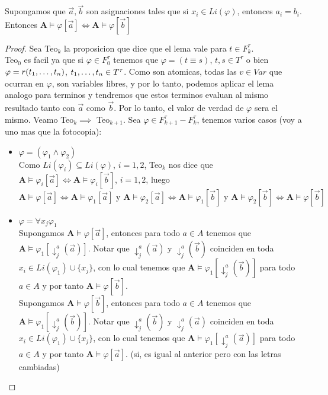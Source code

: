 \begin{lemma}
  Supongamos que $\vec{a}, \vec{b}$ son asignaciones tales que si $x_i \in Li(\varphi)$, entonces $a_i = b_i$. Entonces
  $\mathbf{A}\models\varphi[\vec{a}] \iff \mathbf{A}\models\varphi[\vec{b}]$
\end{lemma}
\begin{proof}
  Sea Teo$_k$ la proposicion que dice que el lema vale para $t \in F_k^\tau$.\\
  Teo$_0$ es facil ya que si $\varphi \in F_0^\tau$ tenemos que $\varphi = (t\equiv s)$, $t,s\in T^\tau$ o bien $\varphi = r(t_{1}, \dots, t_{n})$, $t_{1}, \dots, t_{n} \in T^\tau$. Como son atomicas, todas las $v \in Var$ que 
  ocurran en $\varphi$, son variables libres, y por lo tanto, podemos aplicar el lema analogo para terminos y tendremos que estos terminos evaluan al mismo resultado tanto con $\vec{a}$ como $\vec{b}$. Por lo tanto,
  el valor de verdad de $\varphi$ sera el mismo.
  Veamo Teo$_k \implies$ Teo$_{k+1}$. Sea $\varphi \in F_{k+1}^\tau - F_k^\tau$, tenemos varios casos (voy a uno mas que la fotocopia):
  \begin{itemize}
    \item $\varphi = (\varphi_1\land\varphi_2)$\\
    Como $Li(\varphi_i) \subseteq Li(\varphi)$, $i = 1, 2$, Teo$_k$ nos dice que $\mathbf{A}\models\varphi_i[\vec{a}]\iff\mathbf{A}\models\varphi_i[\vec{b}]$, $i = 1, 2$, luego\\
    $\mathbf{A}\models\varphi[\vec{a}]\iff\mathbf{A}\models\varphi_1[\vec{a}]\text{ y }\mathbf{A}\models\varphi_2[\vec{a}]\iff\mathbf{A}\models\varphi_1[\vec{b}]\text{ y }\mathbf{A}\models\varphi_2[\vec{b}]\iff\mathbf{A}\models\varphi[\vec{b}]$
    \item $\varphi = \forall x_j \varphi_1$\\
    Supongamos $\mathbf{A}\models\varphi[\vec{a}]$, entonces para todo $a \in A$ tenemos que $\mathbf{A}\models\varphi_1[\downarrow_j^a(\vec{a})]$. Notar que 
    $\downarrow_j^a(\vec{a})$ y $\downarrow_j^a(\vec{b})$ coinciden en toda $x_i \in Li(\varphi_1)\cup\{x_j\}$, con lo cual tenemos que $\mathbf{A}\models\varphi_1[\downarrow_j^a(\vec{b})]$ para todo $a \in A$ y por tanto $\mathbf{A}\models\varphi[\vec{b}]$. \\
    Supongamos $\mathbf{A}\models\varphi[\vec{b}]$, entonces para todo $a \in A$ tenemos que $\mathbf{A}\models\varphi_1[\downarrow_j^a(\vec{b})]$. Notar que 
    $\downarrow_j^a(\vec{b})$ y $\downarrow_j^a(\vec{a})$ coinciden en toda $x_i \in Li(\varphi_1)\cup\{x_j\}$, con lo cual tenemos que $\mathbf{A}\models\varphi_1[\downarrow_j^a(\vec{a})]$ para todo $a \in A$ y por tanto $\mathbf{A}\models\varphi[\vec{a}]$. (si, es igual al anterior pero con las letras cambiadas)\\

\end{itemize}
\end{proof}
